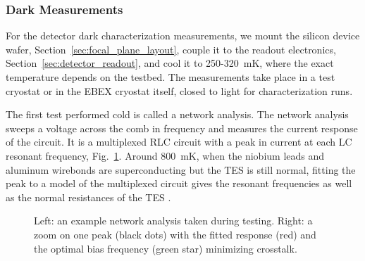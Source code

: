 \documentclass[../EBEXPaper2.tex]{subfiles}
\begin{document}
\subsubsection{Dark Measurements}
\label{sec:dark_measurements}



For the detector dark characterization measurements, we mount the silicon device wafer, Section~\ref{sec:focal_plane_layout}, couple it to the readout electronics, Section~\ref{sec:detector_readout}, and cool it to 250-320~mK, where the exact temperature depends on the testbed. 
The measurements take place in a test cryostat or in the \ac{EBEX} cryostat itself, closed to light for characterization runs. %

The first test performed cold is called a network analysis. 
The network analysis sweeps a voltage across the comb in frequency and measures the current response of the circuit. 
It is a multiplexed RLC circuit with a peak in current at each LC resonant frequency, Fig.~\ref{fig:network_analysis}. 
Around 800~mK, when the niobium leads and aluminum wirebonds are superconducting but the TES is still normal, fitting the peak to a model of the multiplexed circuit gives the resonant frequencies as well as the normal resistances of the TES \citep{MacDermid_thesis}. 


\begin{figure}[htbp]
\begin{center}
\caption{Left: an example network analysis taken during testing.
Right: a zoom on one peak (black dots) with the fitted response (red) and the optimal bias frequency (green star) minimizing crosstalk.}
\label{fig:network_analysis}
\end{center}
\end{figure}
\end{document}
